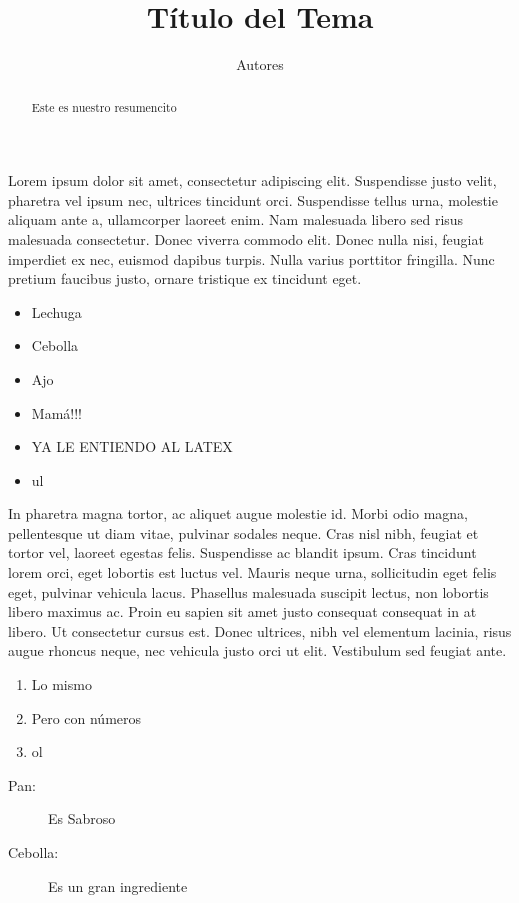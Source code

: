 \documentclass{article}
\title{Título del Tema}
\author{Autores}
\date{}
\begin{document}
    \maketitle

    \begin{abstract}
        Este es nuestro resumencito
    \end{abstract}
    
    Lorem ipsum dolor sit amet, consectetur adipiscing elit. Suspendisse justo velit, pharetra vel ipsum nec, ultrices tincidunt orci. Suspendisse tellus urna, molestie aliquam ante a, ullamcorper laoreet enim. Nam malesuada libero sed risus malesuada consectetur. Donec viverra commodo elit. Donec nulla nisi, feugiat imperdiet ex nec, euismod dapibus turpis. Nulla varius porttitor fringilla. Nunc pretium faucibus justo, ornare tristique ex tincidunt eget.

    \begin{itemize}
        \item Lechuga
        \item Cebolla
        \item Ajo
        \item Mamá!!!
        \item YA LE ENTIENDO AL LATEX
        \item ul
    \end{itemize}

    In pharetra magna tortor, ac aliquet augue molestie id. Morbi odio magna, pellentesque ut diam vitae, pulvinar sodales neque. Cras nisl nibh, feugiat et tortor vel, laoreet egestas felis. Suspendisse ac blandit ipsum. Cras tincidunt lorem orci, eget lobortis est luctus vel. Mauris neque urna, sollicitudin eget felis eget, pulvinar vehicula lacus. Phasellus malesuada suscipit lectus, non lobortis libero maximus ac. Proin eu sapien sit amet justo consequat consequat in at libero. Ut consectetur cursus est. Donec ultrices, nibh vel elementum lacinia, risus augue rhoncus neque, nec vehicula justo orci ut elit. Vestibulum sed feugiat ante.

    \begin{enumerate}
        \item Lo mismo
        \item Pero con números
        \item ol
    \end{enumerate}

    \begin{description}
        \item[Pan:] Es Sabroso
        \item[Cebolla:] Es un gran ingrediente 
    \end{description}
\end{document}
